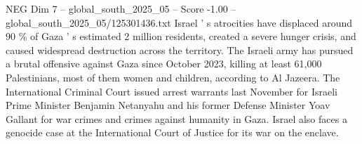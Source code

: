 \begin{textsample}{NEG Dim 7 – global\_south\_2025\_05 – Score -1.00 – global\_south\_2025\_05/125301436.txt}
Israel ' s atrocities have displaced around 90 \% of Gaza ' s estimated 2 million residents, created a severe hunger crisis, and caused widespread destruction across the territory.
The Israeli army has pursued a brutal offensive against Gaza since October 2023, killing at least 61,000 Palestinians, most of them women and children, according to Al Jazeera.
The International Criminal Court issued arrest warrants last November for Israeli Prime Minister Benjamin Netanyahu and his former Defense Minister Yoav Gallant for war crimes and crimes against humanity in Gaza.
Israel also faces a genocide case at the International Court of Justice for its war on the enclave.

\end{textsample}

